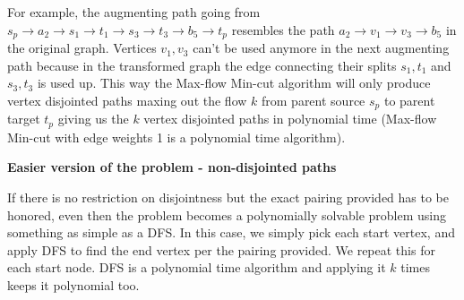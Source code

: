 \documentclass{imports}
\begin{document}
    For example, the augmenting path going from $s_p \to a_2 \to s_1 \to t_1 \to s_3 \to t_3 \to b_5 \to t_p$ resembles the path
    $a_2 \to v_1 \to v_3 \to b_5$ in the original graph. Vertices $v_1, v_3$ can't be used anymore in the next augmenting path because in the transformed
    graph the edge connecting their splits $s_1, t_1$ and $s_3, t_3$ is used up. This way the Max-flow Min-cut algorithm will only produce 
    vertex disjointed paths maxing out the flow $k$ from parent source $s_p$ to parent target $t_p$ giving us the $k$ vertex disjointed paths in polynomial time 
    (Max-flow Min-cut with edge weights 1 is a polynomial time algorithm).\vspace{10pt}


    \textbf{Easier version of the problem - non-disjointed paths} \vspace{10pt}

    If there is no restriction on disjointness but the exact pairing provided has to be honored, even then the problem becomes a 
    polynomially solvable problem using something as simple as a DFS. In this case, we simply pick each start vertex, and apply DFS to find
    the end vertex per the pairing provided. We repeat this for each start node. DFS is a polynomial time algorithm and applying it $k$ times
    keeps it polynomial too.

    \vspace{10pt}
    \cite{team}
    \newpage
    
    
\end{document}
